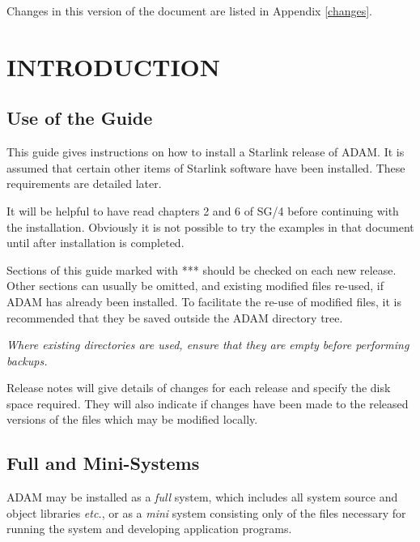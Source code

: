 Changes in this version of the document are listed in Appendix \ref{changes}.
\markright{\stardocname}
\newpage
\markright{\stardocname}

\small
  \setlength{\parskip}{0mm}
  \tableofcontents
  \setlength{\parskip}{\medskipamount}
  \markright{\stardocname}
\normalsize
\newpage
\section{INTRODUCTION}
\subsection{Use of the Guide}
This guide gives instructions on how to install a Starlink release
of ADAM. It is assumed that certain other items of
Starlink software have been installed.
These requirements are detailed later.

It will be helpful to have read chapters 2 and 6 of SG/4 \cite{sg4}
before continuing with the installation.
Obviously it is not possible to try the examples in that document until
after installation is completed.

Sections of this guide marked with *** should be checked on each new release.
Other sections can usually be omitted, and existing modified files re-used, if 
ADAM has already been installed. 
To facilitate the re-use of modified files, it is recommended that they be
saved outside the ADAM directory tree.

{\em Where existing directories are used, ensure that they are empty before
performing backups.}

Release notes \cite{ssn45} will give details of changes for each release and 
specify the disk space required.
They will also indicate if changes have been made to the released versions
of the files which may be modified locally.

\subsection{Full and Mini-Systems}
ADAM may be installed as a {\em full} system, which includes all system source
and object libraries {\em etc.}, or as a {\em mini} system consisting only of 
the files necessary for running the system and developing application programs.

